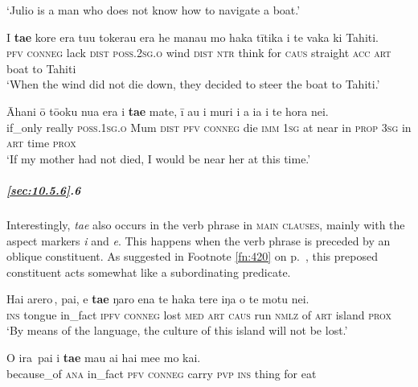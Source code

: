 \glt 
‘Julio is a man who does not know how to navigate a boat.’ \textstyleExampleref{[R303.151]} 
\z

\ea\label{ex:10.153}
\gll I \textbf{ta{\ꞌ}e} kore era tu{\ꞌ}u tokerau era he mana{\ꞌ}u mo haka tītika  i te vaka ki Tahiti.\\
\textsc{pfv} \textsc{conneg} lack \textsc{dist} \textsc{poss.2sg.o} wind \textsc{dist} \textsc{ntr} think for \textsc{caus} straight  \textsc{acc} \textsc{art} boat to Tahiti\\

\glt 
‘When the wind did not die down, they decided to steer the boat to Tahiti.’ \textstyleExampleref{[R303.064]} 
\z

\ea\label{ex:10.154}
\gll {\ꞌ}Āhani {\ꞌ}ō tō{\ꞌ}oku nua era i \textbf{ta{\ꞌ}e} mate, {\ꞌ}ī au  {\ꞌ}i muri i a ia {\ꞌ}i te hora nei.\\
if\_only really \textsc{poss.1sg.o} Mum \textsc{dist} \textsc{pfv} \textsc{conneg} die \textsc{imm} \textsc{1sg}  at near in \textsc{prop} \textsc{3sg} in \textsc{art} time \textsc{prox}\\

\glt 
‘If my mother had not died, I would be near her at this time.’ \textstyleExampleref{[R245.007]} 
\z

\subparagraph{\ref{sec:10.5.6}.6} Interestingly, \textit{ta{\ꞌ}e} also occurs in the verb phrase in \textsc{main clauses}, mainly with the aspect markers \textit{i} and \textit{e}. This happens when the verb phrase is preceded by an oblique constituent. As suggested in Footnote \ref{fn:420} on p.~\pageref{fn:420}, this preposed constituent acts somewhat like a subordinating predicate.

\ea\label{ex:10.155}
\gll {\ob}Hai {\ꞌ}arero\,{\cb}, pa{\ꞌ}i, e \textbf{ta{\ꞌ}e} ŋaro ena te haka tere iŋa  o te motu nei.\\
{\db}\textsc{ins} tongue in\_fact \textsc{ipfv} \textsc{conneg} lost \textsc{med} \textsc{art} \textsc{caus} run \textsc{nmlz}  of \textsc{art} island \textsc{prox}\\

\glt 
‘By means of the language, the culture of this island will not be lost.’ \textstyleExampleref{[R647.155]} 
\z

\ea\label{ex:10.156}
\gll {\ob}{\ꞌ}O ira\,{\cb} pa{\ꞌ}i i \textbf{ta{\ꞌ}e} ma{\ꞌ}u ai hai me{\ꞌ}e mo kai. \\
{\db}because\_of \textsc{ana} in\_fact \textsc{pfv} \textsc{conneg} carry \textsc{pvp} \textsc{ins} thing for eat \\

